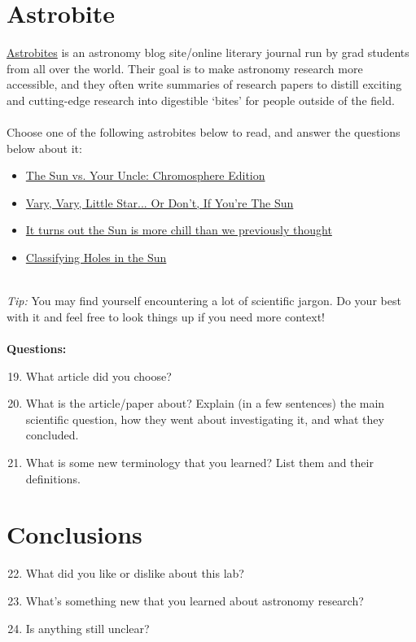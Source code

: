 \documentclass[12pt]{article}%
\begin{document}
\section{Astrobite}

\href{http://www.astrobites.org}{Astrobites} is an astronomy blog site/online literary journal run by grad students from all over the world. Their goal is to make astronomy research more accessible, and they often write summaries of research papers to distill exciting and cutting-edge research into digestible `bites' for people outside of the field.\\
\\
Choose one of the following astrobites below to read, and answer the questions below about it:
\begin{itemize}
    \item \href{https://astrobites.org/2019/07/02/the-sun-vs-your-uncle-chromosphere-edition/}{The Sun vs. Your Uncle: Chromosphere Edition}
    \item \href{https://astrobites.org/2018/12/24/vary-vary-little-star/}{Vary, Vary, Little Star... Or Don't, If You're The Sun}
    \item \href{https://astrobites.org/2016/11/23/it-turns-out-the-sun-is-more-chill-than-we-previously-thought/}{It turns out the Sun is more chill than we previously thought}
    \item \href{https://astrobites.org/2015/06/30/classifying-holes-in-sun/}{Classifying Holes in the Sun}
\end{itemize}\\

\textit{Tip:} You may find yourself encountering a lot of scientific jargon. Do your best with it and feel free to look things up if you need more context!\\
\\
\textbf{Questions:}
\begin{enumerate}
\setcounter{enumi}{18}
    \item What article did you choose?
    \item What is the article/paper about? Explain (in a few sentences) the main scientific question, how they went about investigating it, and what they concluded.
    \item What is some new terminology that you learned? List them and their definitions.
\end{enumerate}
\section{Conclusions}
\begin{enumerate}
\setcounter{enumi}{21}
    \item What did you like or dislike about this lab?  
    \item What's something new that you learned about astronomy research?
    \item Is anything still unclear?
\end{enumerate}
\end{document}
